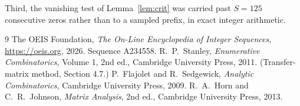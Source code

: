 \documentclass[11pt,a4paper]{article}
\theoremstyle{plain}
\theoremstyle{definition}
\begin{document}
Third, the vanishing test of Lemma~\ref{lem:crit} was carried past $S=125$ consecutive
zeros rather than to a sampled prefix, in exact integer arithmetic.

\begin{thebibliography}{9}
 The OEIS Foundation, \emph{The On-Line Encyclopedia of Integer
Sequences}, \url{https://oeis.org}, 2026. Sequence A234558.
 R.~P.~Stanley, \emph{Enumerative Combinatorics}, Volume 1, 2nd ed.,
Cambridge University Press, 2011. (Transfer-matrix method, Section 4.7.)
 P.~Flajolet and R.~Sedgewick, \emph{Analytic Combinatorics}, Cambridge
University Press, 2009.
 R.~A.~Horn and C.~R.~Johnson, \emph{Matrix Analysis}, 2nd ed., Cambridge
University Press, 2013.
\end{thebibliography}
\end{document}
